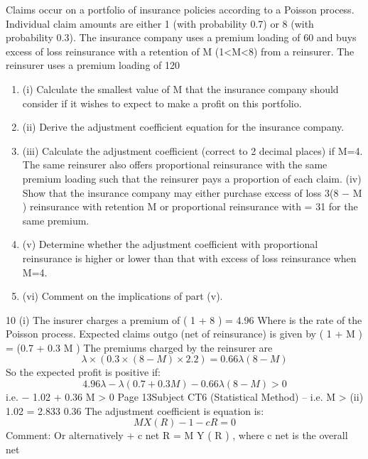 \documentclass[a4paper,12pt]{article}
\begin{document}
Claims occur on a portfolio of insurance policies according to a Poisson process.
Individual claim amounts are either 1 (with probability 0.7) or 8 (with probability
0.3). The insurance company uses a premium loading of 60%
and buys excess of loss reinsurance with a retention of M (1<M<8) from a reinsurer.
The reinsurer uses a premium loading of 120%
\begin{enumerate}
\item (i) Calculate the smallest value of M that the insurance company should consider
if it wishes to expect to make a profit on this portfolio.

\item (ii) Derive the adjustment coefficient equation for the insurance company. 
\item (iii) Calculate the adjustment coefficient (correct to 2 decimal places) if M=4. 
The same reinsurer also offers proportional reinsurance with the same premium
loading such that the reinsurer pays a proportion \alpha  of each claim.
(iv) Show that the insurance company may either purchase excess of loss
3(8 − M )
reinsurance with retention M or proportional reinsurance with \alpha  =
31
for the same premium.

\item (v) Determine whether the adjustment coefficient with proportional reinsurance is
higher or lower than that with excess of loss reinsurance when M=4.

\item (vi) Comment on the implications of part (v).
\end{enumerate}
10
(i)
The insurer charges a premium of \lambda  \times  ( 1  + 8  )  = 4.96 \lambda 
Where \lambda  is the rate of the Poisson process. Expected claims outgo (net of
reinsurance) is given by \lambda  \times  ( 1  + M  ) = \lambda  (0.7 + 0.3 M )
The premiums charged by the reinsurer are
\[\lambda  \times  ( 0.3 \times  ( 8 − M ) \times  2.2 ) = 0.66 \lambda  (8 − M )\]
So the expected profit is positive if:
\[4.96 \lambda  − \lambda  ( 0.7 + 0.3 M ) − 0.66 \lambda  ( 8 − M ) > 0\]
i.e.
− 1.02 + 0.36 M > 0
Page 13Subject CT6 (Statistical Method) – %
i.e.
M >
(ii)
1.02
= 2.833
0.36
The adjustment coefficient is equation is:
\[M X ( R ) − 1 − cR = 0\]
Comment: Or alternatively \lambda  + c net R = \lambda  M Y ( R ) , where c net is the overall net
\end{document}
